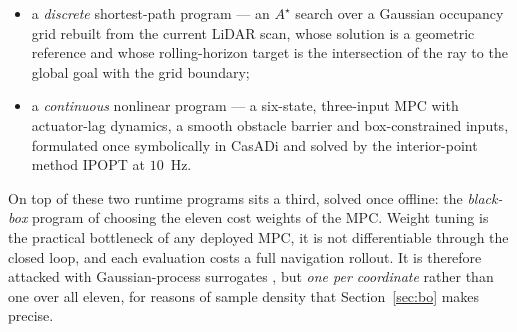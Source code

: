 \documentclass[11pt,a4paper]{article}
\newcommand{\astar}{$A^\star$}
\begin{document}
\begin{itemize}
  \item a \emph{discrete} shortest-path program --- an \astar{} search over a Gaussian occupancy grid rebuilt
        from the current LiDAR scan, whose solution is a geometric reference and whose rolling-horizon target
        is the intersection of the ray to the global goal with the grid boundary;
  \item a \emph{continuous} nonlinear program --- a six-state, three-input MPC with actuator-lag dynamics, a
        smooth obstacle barrier and box-constrained inputs, formulated once symbolically in CasADi
        \cite{andersson2019casadi} and solved by the interior-point method IPOPT
        \cite{wachter2006ipopt} at $10$~Hz.
\end{itemize}

On top of these two runtime programs sits a third, solved once offline: the \emph{black-box} program of
choosing the eleven cost weights of the MPC. Weight tuning is the practical bottleneck of any deployed MPC,
it is not differentiable through the closed loop, and each evaluation costs a full navigation rollout. It is
therefore attacked with Gaussian-process surrogates \cite{rasmussen2006gp,shahriari2016bo}, but
\emph{one per coordinate} rather than one over all eleven, for reasons of sample density that
Section~\ref{sec:bo} makes precise.
\end{document}
